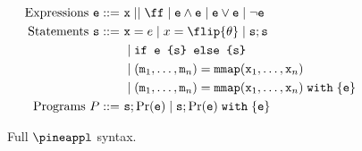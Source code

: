 \begin{wrapfigure}{r}{0.61\linewidth}
  \begin{mdframed}
    {\footnotesize\begin{align*}
    \text{Expressions } \texttt{e} ::= \ & \texttt{x} \mid \tt \mid \ff \mid
    \texttt{e} \land \texttt{e} \mid \texttt{e} \lor \texttt{e} \mid
    \neg \texttt{e} &\\
    \text{Statements } \texttt{s} ::= \ & \texttt{x} = e \mid x = \flip{\theta} \mid \texttt{s} ; \texttt{s}&\\
    &\mid
    \texttt{if e \{s\} else \{s\}} &\\
    &\mid (\texttt{m}_1, \hdots, \texttt{m}_n) = \texttt{mmap}(\texttt{x}_1, \hdots, \texttt{x}_n) &\\
    &\mid (\texttt{m}_1, \hdots, \texttt{m}_n) = \texttt{mmap}(\texttt{x}_1, \hdots, \texttt{x}_n) \; \texttt{with} \; \{ \texttt{e} \} &\\
    \text{Programs } P ::= \ & \texttt{s} ; \Pr(\texttt{e}) \mid \texttt{s} ; \Pr(\texttt{e}) \; \texttt{with} \; \{ \texttt{e}  \}
    \end{align*}}
  \end{mdframed}
    \caption{Full $\pineappl$ syntax.}
    \label{fig:pineappl-syntax}
\end{wrapfigure}
